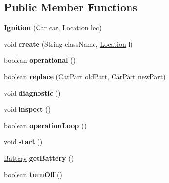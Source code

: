 \subsection*{Public Member Functions}
\begin{DoxyCompactItemize}
\item 
\hypertarget{classSystems_1_1Ignition_a708dc9c45f9c5f00c250281b94c1bfae}{}{\bfseries Ignition} (\hyperlink{classCars_1_1Car}{Car} car, \hyperlink{enumEnums_1_1Location}{Location} loc)\label{classSystems_1_1Ignition_a708dc9c45f9c5f00c250281b94c1bfae}

\item 
\hypertarget{classSystems_1_1Ignition_a88b183cbe5d44e0edb0fcdfc62f8f4ce}{}void {\bfseries create} (String class\+Name, \hyperlink{enumEnums_1_1Location}{Location} l)\label{classSystems_1_1Ignition_a88b183cbe5d44e0edb0fcdfc62f8f4ce}

\item 
\hypertarget{classSystems_1_1Ignition_a02bb30030dfc36e078911eac87f13e26}{}boolean {\bfseries operational} ()\label{classSystems_1_1Ignition_a02bb30030dfc36e078911eac87f13e26}

\item 
\hypertarget{classSystems_1_1Ignition_ac51b96fa23458e461fa8a97f0e8764cd}{}boolean {\bfseries replace} (\hyperlink{classCars_1_1CarPart}{Car\+Part} old\+Part, \hyperlink{classCars_1_1CarPart}{Car\+Part} new\+Part)\label{classSystems_1_1Ignition_ac51b96fa23458e461fa8a97f0e8764cd}

\item 
\hypertarget{classSystems_1_1Ignition_aa3b1a393839cbb267f20ceef4d1ebbdc}{}void {\bfseries diagnostic} ()\label{classSystems_1_1Ignition_aa3b1a393839cbb267f20ceef4d1ebbdc}

\item 
\hypertarget{classSystems_1_1Ignition_a41f2c709c74501bb2b5e17443633cea1}{}void {\bfseries inspect} ()\label{classSystems_1_1Ignition_a41f2c709c74501bb2b5e17443633cea1}

\item 
\hypertarget{classSystems_1_1Ignition_ab6ba7260e0b7481ce63808773438ba29}{}boolean {\bfseries operation\+Loop} ()\label{classSystems_1_1Ignition_ab6ba7260e0b7481ce63808773438ba29}

\item 
\hypertarget{classSystems_1_1Ignition_adc942df153ff686b31c00b37e3de4a13}{}void {\bfseries start} ()\label{classSystems_1_1Ignition_adc942df153ff686b31c00b37e3de4a13}

\item 
\hypertarget{classSystems_1_1Ignition_abcfa220a77b0b130bffbe94c2ac39fcd}{}\hyperlink{classElectricalParts_1_1Battery}{Battery} {\bfseries get\+Battery} ()\label{classSystems_1_1Ignition_abcfa220a77b0b130bffbe94c2ac39fcd}

\item 
\hypertarget{classSystems_1_1Ignition_ad1c383dc5f3eb96fc638c9edf586e529}{}boolean {\bfseries turn\+Off} ()\label{classSystems_1_1Ignition_ad1c383dc5f3eb96fc638c9edf586e529}

\end{DoxyCompactItemize}
